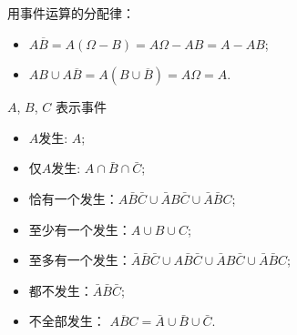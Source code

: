 \begin{solution}
    用事件运算的分配律：
    \begin{itemize}
        \item $A\overline{B}=A(\Omega-B)=A\Omega-AB=A-AB$;
        \item $AB\cup A\overline{B}=A(B\cup\overline{B})=A\Omega=A$.
    \end{itemize}
\end{solution}

\begin{example}
    $A$, $B$, $C$ 表示事件
    \begin{itemize}
        \item $A$发生: $A$;
        \item 仅$A$发生: $A\cap \bar{B}\cap \bar{C}$;
        \item 恰有一个发生：$A \bar B \bar C\cup \bar AB\bar C\cup \bar A\bar BC$;
        \item 至少有一个发生：$A\cup B\cup C$;
        \item 至多有一个发生：$\bar A\bar B\bar C\cup A \bar B \bar C \cup \bar AB\bar C\cup \bar A\bar BC$;
        \item 都不发生：$\bar A\bar B\bar C$;
        \item 不全部发生： $\overline{ABC}=\bar A\cup \bar B\cup \bar C$.
    \end{itemize}
\end{example}

